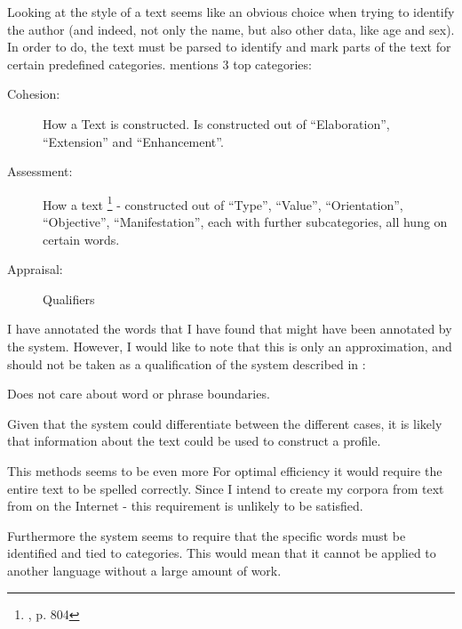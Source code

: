 {\label{stylistic}
Looking at the style of a text seems like an obvious choice when trying to identify the author (and indeed, not only the name, but also other data, like age and sex). In order to do, the text must be parsed to identify and mark parts of the text for certain predefined categories. \cite{style} mentions 3 top categories: 
\begin{description}
\item[Cohesion:] How a Text is constructed. Is constructed out of ``Elaboration'', ``Extension'' and ``Enhancement''.
\item[Assessment:] How a text \footnote{\cite{style}, p. 804} - constructed out of  ``Type'', ``Value'', ``Orientation'', ``Objective'', ``Manifestation'', each with further subcategories, all hung on certain words.
\item[Appraisal:] Qualifiers
\end{description}
}
{
I have annotated the words that I have found that might have been annotated by the system. However, I would like to note that this is only an approximation, and should not be taken as a qualification of the system described in \cite{style}:
}  
{
\item Does not care about word or phrase boundaries.
\item Given that the system could differentiate between the different cases, it is likely that information about the text could be used to construct a profile.
}{
\item This methods seems to be even more For optimal efficiency it would require the entire text to be spelled correctly. Since I intend to create my corpora from text from \forum on the Internet - this requirement is unlikely to be satisfied.
\item Furthermore the system seems to require that the specific words must be identified and tied to categories. This would mean that it cannot be applied to another language without a large amount of work.
} 

